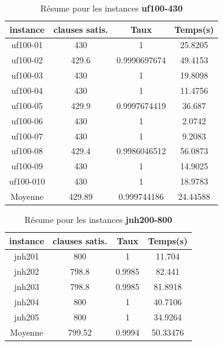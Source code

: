 	\begin{table}[H]
		\centering
		\begin{tabular}{|c|c|c|c|}
			\hline
			\textbf{instance} & \textbf{clauses satis.} & \textbf{Taux} & \textbf{Temps(s)} \\ \hline
			uf100-01          & 430                        & 1             & 25.8205       \\ \hline
			uf100-02          & 429.6                      & 0.9990697674  & 49.4153       \\ \hline
			uf100-03          & 430                        & 1             & 19.8098       \\ \hline
			uf100-04          & 430                        & 1             & 11.4756       \\ \hline
			uf100-05          & 429.9                      & 0.9997674419  & 36.687        \\ \hline
			uf100-06          & 430                        & 1             & 2.0742        \\ \hline
			uf100-07          & 430                        & 1             & 9.2083        \\ \hline
			uf100-08          & 429.4                      & 0.9986046512  & 56.0873       \\ \hline
			uf100-09          & 430                        & 1             & 14.9025       \\ \hline
			uf100-010         & 430                        & 1             & 18.9783       \\ \hline
			Moyenne           & 429.89                     & 0.999744186   & 24.44588      \\ \hline
		\end{tabular}
		\caption{Résume pour les instances \textbf{uf100-430}}
		\label{my-label}
	\end{table}
	
	\begin{table}[H]
		\centering
		\begin{tabular}{|c|c|c|c|}
			\hline
			\textbf{instance} & \textbf{clauses satis.} & \textbf{Taux} & \textbf{Temps(s)} \\ \hline
			jnh201            & 800                        & 1             & 11.704        \\ \hline
			jnh202            & 798.8                      & 0.9985        & 82.441        \\ \hline
			jnh203            & 798.8                      & 0.9985        & 81.8918       \\ \hline
			jnh204            & 800                        & 1             & 40.7106       \\ \hline
			jnh205            & 800                        & 1             & 34.9264       \\ \hline
			Moyenne           & 799.52                     & 0.9994        & 50.33476      \\ \hline
		\end{tabular}
		\caption{Résume pour les instances \textbf{jnh200-800}}
	\end{table}
	
